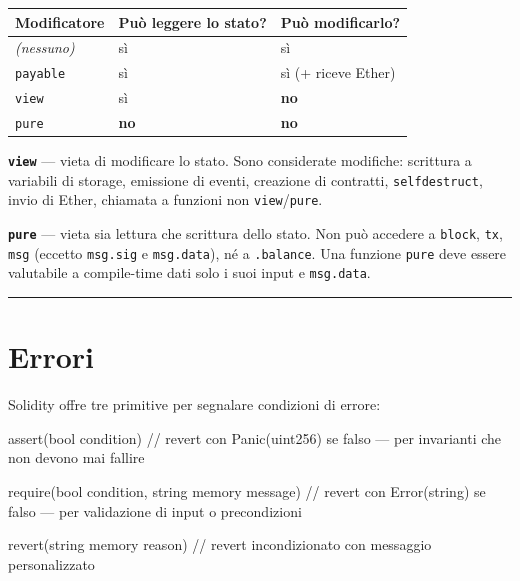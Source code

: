 \documentclass[
  italian,
  openany]{book}
\newenvironment{Shaded}{\begin{snugshade}}{\end{snugshade}}
\newcommand{\NormalTok}[1]{#1}
\newcounter{none} %
\begin{document}
{\def\LTcaptype{none} %
\begin{longtable}[]{@{}lll@{}}
\toprule\noalign{}
Modificatore & Può leggere lo stato? & Può modificarlo? \\
\midrule\noalign{}
\endhead
\bottomrule\noalign{}
\endlastfoot
\emph{(nessuno)} & sì & sì \\
\texttt{payable} & sì & sì (+ riceve Ether) \\
\texttt{view} & sì & \textbf{no} \\
\texttt{pure} & \textbf{no} & \textbf{no} \\
\end{longtable}
}

\textbf{\texttt{view}} --- vieta di modificare lo stato. Sono
considerate modifiche: scrittura a variabili di storage, emissione di
eventi, creazione di contratti, \texttt{selfdestruct}, invio di Ether,
chiamata a funzioni non \texttt{view}/\texttt{pure}.

\textbf{\texttt{pure}} --- vieta sia lettura che scrittura dello stato.
Non può accedere a \texttt{block}, \texttt{tx}, \texttt{msg} (eccetto
\texttt{msg.sig} e \texttt{msg.data}), né a \texttt{.balance}. Una
funzione \texttt{pure} deve essere valutabile a compile-time dati solo i
suoi input e \texttt{msg.data}.

\begin{center}\rule{0.5\linewidth}{0.5pt}\end{center}

\section{Errori}\label{errori}

Solidity offre tre primitive per segnalare condizioni di errore:

\begin{Shaded}
\begin{Highlighting}[]
\NormalTok{assert(bool condition)}
\NormalTok{// revert con Panic(uint256) se falso — per invarianti che non devono mai fallire}

\NormalTok{require(bool condition, string memory message)}
\NormalTok{// revert con Error(string) se falso — per validazione di input o precondizioni}

\NormalTok{revert(string memory reason)}
\NormalTok{// revert incondizionato con messaggio personalizzato}
\end{Highlighting}
\end{Shaded}
\end{document}
